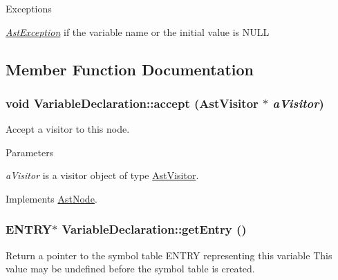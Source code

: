 \begin{DoxyExceptions}{Exceptions}
\item[{\em \hyperlink{classAstException}{AstException}}]if the variable name or the initial value is NULL \end{DoxyExceptions}


\subsection{Member Function Documentation}
\hypertarget{classVariableDeclaration_af8e0086b00a9bc45f2aff7bf91d8f17d}{
\subsubsection[{accept}]{\setlength{\rightskip}{0pt plus 5cm}void VariableDeclaration::accept ({\bf AstVisitor} $\ast$ {\em aVisitor})}}
\label{classVariableDeclaration_af8e0086b00a9bc45f2aff7bf91d8f17d}
Accept a visitor to this node. 
\begin{DoxyParams}{Parameters}
\item[{\em aVisitor}]is a visitor object of type \hyperlink{classAstVisitor}{AstVisitor}. \end{DoxyParams}


Implements \hyperlink{classAstNode_a67b2d6ce1262da2954fb4db255759fb3}{AstNode}.\hypertarget{classVariableDeclaration_a42520812cc7fd155b4d30852ca1c68f7}{
\subsubsection[{getEntry}]{\setlength{\rightskip}{0pt plus 5cm}ENTRY$\ast$ VariableDeclaration::getEntry ()}}
\label{classVariableDeclaration_a42520812cc7fd155b4d30852ca1c68f7}
Return a pointer to the symbol table ENTRY representing this variable This value may be undefined before the symbol table is created.

